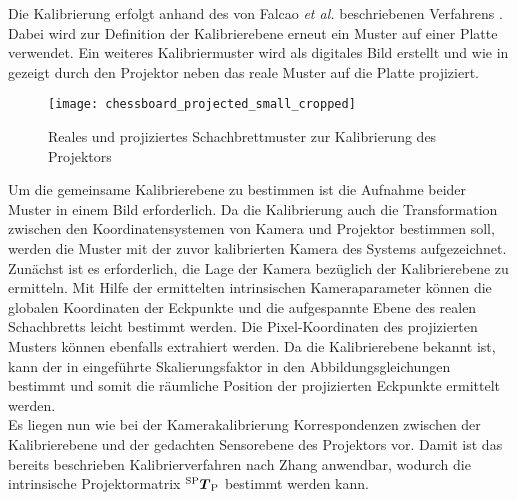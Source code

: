 Die Kalibrierung erfolgt anhand des von Falcao \textit{et al.} beschriebenen Verfahrens \cite{Falcao2008}. Dabei wird zur Definition der Kalibrierebene erneut ein Muster auf einer Platte verwendet. Ein weiteres Kalibriermuster wird als digitales Bild erstellt und wie in  gezeigt durch den Projektor neben das reale Muster auf die Platte projiziert.

\clearpage{}

\begin{figure}[ht]
	\begin{center}
		\texttt{[image: chessboard\_projected\_small\_cropped]}
		\caption{Reales und projiziertes Schachbrettmuster zur Kalibrierung des Projektors}
		\label{fig.projcalib}
	\end{center}
\end{figure}

\prever{
}

Um die gemeinsame Kalibrierebene zu bestimmen ist die Aufnahme beider Muster in einem Bild erforderlich. Da die Kalibrierung auch die Transformation zwischen den Koordinatensystemen von Kamera und Projektor bestimmen soll, werden die Muster mit der zuvor kalibrierten Kamera des Systems aufgezeichnet.\\

Zunächst ist es erforderlich, die Lage der Kamera bezüglich der Kalibrierebene zu ermitteln. Mit Hilfe der ermittelten intrinsischen Kameraparameter können die globalen Koordinaten der Eckpunkte und die aufgespannte Ebene des realen Schachbretts leicht bestimmt werden. Die Pixel-Koordinaten des projizierten Musters können ebenfalls extrahiert werden. Da die Kalibrierebene bekannt ist, kann der in  eingeführte Skalierungsfaktor in den Abbildungsgleichungen bestimmt und somit die räumliche Position der projizierten Eckpunkte ermittelt werden.\\

Es liegen nun wie bei der Kamerakalibrierung Korrespondenzen zwischen der Kalibrierebene und der gedachten Sensorebene des Projektors vor. Damit ist das bereits beschrieben Kalibrierverfahren nach Zhang anwendbar, wodurch die intrinsische Projektormatrix ${^{\mathrm{SP}}\mbox{\boldmath{$T$}}_{\mathrm{P}}}$ bestimmt werden kann.\\

\prever{
}

